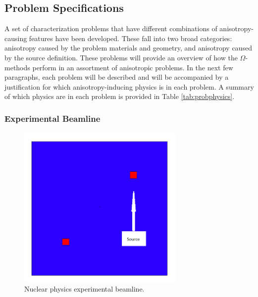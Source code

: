 \subsection{Problem Specifications}
\label{subsec:ProbSpecs}


A set of characterization problems that have
different combinations of anisotropy-causing features have been developed.  These fall
into two broad categories: anisotropy caused by the problem materials and
geometry, and anisotropy caused by the source definition. 
These problems will provide
an overview of how the $\Omega$-methods perform in an assortment of anisotropic
problems. 
In the next few
paragraphs, each problem will be described and will be accompanied by
a justification for which
anisotropy-inducing physics is in each problem. A summary of which physics are
in each problem is provided in Table \ref{tab:probphysics}.

\subsubsection*{Experimental Beamline}
\begin{figure}[h!]
  \centering
  \includegraphics[height=8cm]{./chapters/characterization_probs/figures/geometries/beam.png}
  \caption[Nuclear physics experimental beamline.]{Nuclear physics experimental beamline.}
  \label{fig:beamgeom}
\end{figure}

